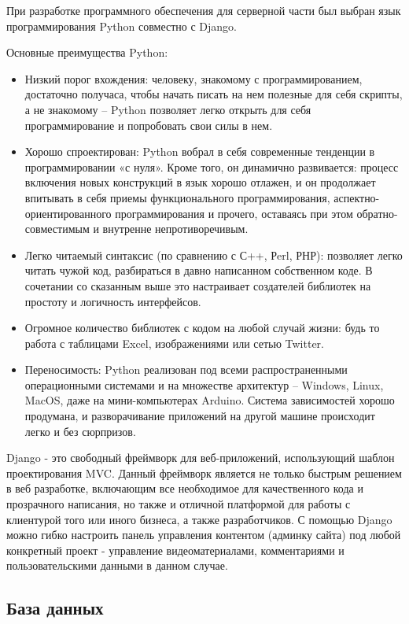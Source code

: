 При разработке программного обеспечения для серверной части был выбран
язык программирования Python совместно с Django.

Основные преимущества Python:
\begin{itemize}[wide,topsep=0pt]
  \itemsep0em
  \item Низкий порог вхождения: человеку, знакомому с программированием, достаточно получаса, чтобы начать писать на нем полезные для себя скрипты, а не знакомому – Python позволяет легко открыть для себя программирование и попробовать свои силы в нем.
  \item Хорошо спроектирован: Python вобрал в себя современные тенденции в программировании «с нуля». Кроме того, он динамично развивается: процесс включения новых конструкций в язык хорошо отлажен, и он продолжает впитывать в себя приемы функционального программирования, аспектно-ориентированного программирования и прочего, оставаясь при этом обратно-совместимым и внутренне непротиворечивым.
  \item Легко читаемый синтаксис (по сравнению с С++, Рerl, РНР): позволяет легко читать чужой код, разбираться в давно написанном собственном коде. В сочетании со сказанным выше это настраивает создателей библиотек на простоту и логичность интерфейсов.
  \item Огромное количество библиотек с кодом на любой случай жизни: будь то работа с таблицами Excel, изображениями или сетью Twitter.
  \item Переносимость: Python реализован под всеми распространенными операционными системами и на множестве архитектур – Windows, Linux, MacOS, даже на мини-компьютерах Arduino. Система зависимостей хорошо продумана, и разворачивание приложений на другой машине происходит легко и без сюрпризов.
\end{itemize}

Django - это свободный фреймворк для веб-приложений, использующий шаблон проектирования MVC.
Данный фреймворк является не только быстрым решением в веб разработке,
включающим все необходимое для качественного кода и прозрачного написания,
но также и отличной платформой для работы с клиентурой того или иного бизнеса,
а также разработчиков. С помощью Django можно гибко настроить панель управления контентом
(админку сайта) под любой конкретный проект - управление видеоматериалами,
комментариями и пользовательскими данными в данном случае.

\subsection{База данных}

